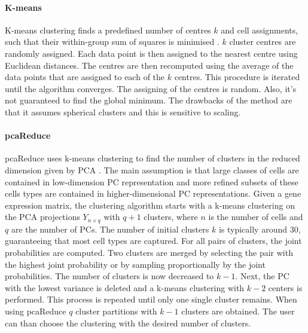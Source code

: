 \documentclass[12pt, a4paper]{article}\usepackage[]{graphicx}\usepackage[]{color}
\begin{document}
\paragraph{K-means}
K-means clustering finds a predefined number of centres $k$ and cell assignments, such that their within-group sum of squares is minimised \citep{hartigan1979algorithm}. $k$ cluster centres are randomly assigned.
Each data point is then assigned to the nearest centre using Euclidean distances. The centres are then recomputed using the average of the data points that are assigned to each of the $k$ centres. This procedure is iterated until the algorithm converges. The assigning of the centres is random. Also, it's not guaranteed to find the global minimum.  The drawbacks of the method are that it assumes spherical clusters and this is sensitive to scaling. 
\paragraph{pcaReduce}
pcaReduce uses k-means clustering to find the number of clusters in the reduced dimension given by PCA \citep{yau2016pcareduce}. The main assumption is that large classes of cells are contained in low-dimension PC representation and more refined subsets of these cells types are contained in higher-dimensional PC representations. Given a gene expression matrix, the clustering algorithm starts with a k-means clustering on the PCA projections $Y_{n\times q}$ with $q+1$ clusters, where $n$ is the number of cells and $q$ are the number of PCs. The number of initial clusters $k$ is typically around 30,  guaranteeing that most cell types are captured. For all pairs of clusters, the joint probabilities are computed. Two clusters are merged by selecting the pair with the highest joint probability or by sampling proportionally by the joint probabilities. The number of clusters is now decreased to $k-1$. Next, the PC with the lowest variance is deleted and a k-means clustering with $k-2$ centers is performed. This process is repeated until only one single cluster remains. When using pcaReduce $q$ cluster partitions with $k-1$ clusters are obtained. The user can than choose the clustering with the desired number of clusters.
\end{document}
